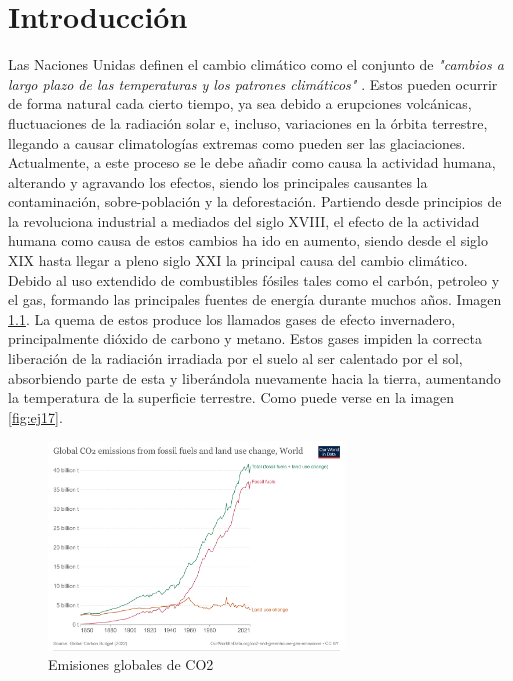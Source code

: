 \chapter[Introducción]{Introducción}
\label{Chap1}

Las Naciones Unidas definen el cambio climático como el conjunto de \textit{"cambios a largo plazo de las temperaturas y los patrones climáticos"} \cite{UNWeb}. Estos pueden ocurrir de forma natural cada cierto tiempo, ya sea debido a erupciones volcánicas, fluctuaciones de la radiación solar e, incluso, variaciones en la órbita terrestre, llegando a causar climatologías extremas como pueden ser las glaciaciones. Actualmente, a este proceso se le debe añadir como causa la actividad humana, alterando y agravando los efectos, siendo los principales causantes la contaminación, sobre-población y la deforestación.\newline
\newline
Partiendo desde principios de la revoluciona industrial a mediados del siglo XVIII, el efecto de la actividad humana como causa de estos cambios ha ido en aumento, siendo desde el siglo XIX hasta llegar a pleno siglo XXI la principal causa del cambio climático. Debido al uso extendido de combustibles fósiles tales como el carbón, petroleo y el gas, formando las principales fuentes de energía durante muchos años. Imagen \ref{fig:ej16}.\newline
\newline
La quema de estos produce los llamados gases de efecto invernadero, principalmente dióxido de carbono y metano. Estos gases impiden la correcta liberación de la radiación irradiada por el suelo al ser calentado por el sol, absorbiendo parte de esta y liberándola nuevamente hacia la tierra, aumentando la temperatura de la superficie terrestre. Como puede verse en la imagen \ref{fig:ej17}.

\begin{figure} [H]
	\centering
	\includegraphics[width=0.7\textwidth]{fig/global-co2-fossil-plus-land-use.png}
	\caption[Emisiones globales de CO2]{Emisiones globales de CO2 \footnotemark}
	\label{fig:ej16}
\end{figure}

